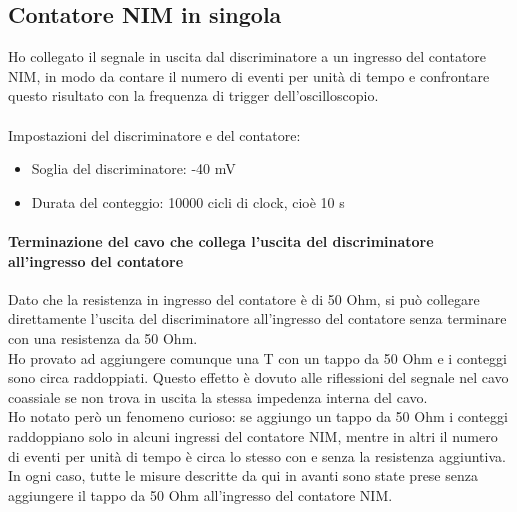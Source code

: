 \documentclass{article}
\begin{document}
\subsection{Contatore NIM in singola}
Ho collegato il segnale in uscita dal discriminatore a un ingresso del contatore NIM, in modo da contare il numero di eventi per unità di tempo e confrontare questo risultato con la frequenza di trigger dell'oscilloscopio. \\
\\Impostazioni del discriminatore e del contatore: 
\begin{itemize}
    \item Soglia del discriminatore: -40 mV
    \item Durata del conteggio: 10000 cicli di clock, cioè 10 s
\end{itemize}
\paragraph{Terminazione del cavo che collega l'uscita del discriminatore all'ingresso del contatore}
Dato che la resistenza in ingresso del contatore è di 50 Ohm, si può collegare direttamente l'uscita del discriminatore all'ingresso del contatore senza terminare con una resistenza da 50 Ohm. 
\\Ho provato ad aggiungere comunque una T con un tappo da 50 Ohm e i conteggi sono circa raddoppiati. Questo effetto è dovuto alle riflessioni del segnale nel cavo coassiale se non trova in uscita la stessa impedenza interna del cavo. 
\\
Ho notato però un fenomeno curioso: se aggiungo un tappo da 50 Ohm i conteggi raddoppiano solo in alcuni ingressi del contatore NIM, mentre in altri il numero di eventi per unità di tempo è circa lo stesso con e senza la resistenza aggiuntiva.
\\
In ogni caso, tutte le misure descritte da qui in avanti sono state prese senza aggiungere il tappo da 50 Ohm all'ingresso del contatore NIM.
\end{document}
